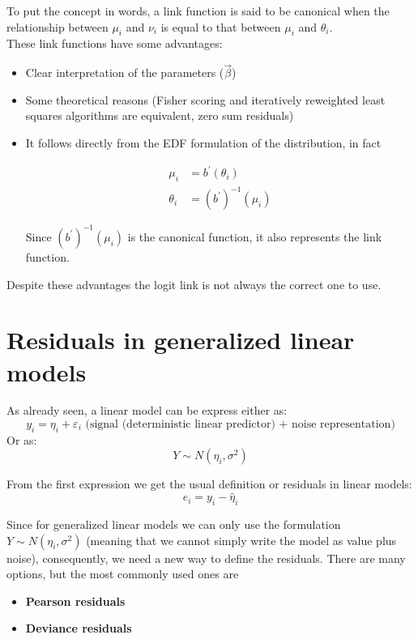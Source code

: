       \noindent To put the concept in words, a link function is said to be
      canonical when the relationship between $\mu_i$ and $\nu_i$ is equal to
      that between $\mu_i$ and $\theta_i$. \\
      
      \noindent These link functions have some advantages:
      \begin{itemize}
        \item Clear interpretation of the parameters ($\vec{\beta}$)
        \item Some theoretical reasons (Fisher scoring and iteratively
        reweighted least squares algorithms are equivalent, zero sum residuals)
        \item It follows directly from the EDF formulation of the distribution,
        in fact 
        
        \begin{align*}
          \mu_i &= b^\prime(\theta_i)\\ 
          \theta_i &= (b^\prime)^{-1}(\mu_i)
        \end{align*}

        Since $(b^\prime)^{-1}(\mu_i)$ is the canonical function, it also
        represents the link function.
        

      \end{itemize}
      Despite these advantages the logit link is not always the correct one to
      use.
  
  \section{Residuals in generalized linear models}
    As already seen, a linear model can be express either as:
    $$y_i = \eta_i + \varepsilon_i \text{    (signal (deterministic linear predictor) + noise representation)}$$ Or
    as: 
    $$Y \sim N(\eta_i, \sigma^2)$$

    From the first expression we get the usual definition or residuals in linear
    models:
    $$e_i = y_i - \hat{\eta}_i$$

    Since for generalized linear models we can only use the formulation $Y \sim
    N(\eta_i, \sigma^2)$ (meaning that we cannot simply write the model as value
    plus noise), consequently, we need a new way to define the residuals. There are many
    options, but the most commonly used ones are 
    
    \begin{itemize}
      \item \textbf{Pearson residuals}
      \item \textbf{Deviance residuals}
    \end{itemize}


